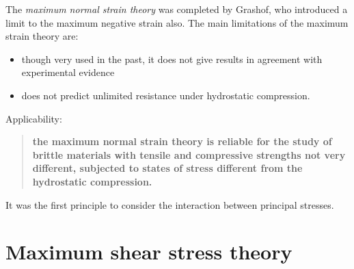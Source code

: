 \documentclass[class=report, crop=false, 12pt,a4paper]{standalone}
\begin{document}
The \textit{maximum normal strain theory} was completed by Grashof, who introduced a limit to the maximum negative strain also. The main limitations of the maximum strain theory are:
\begin{itemize}
  \item though very used in the past, it does not give results in agreement with experimental evidence
  \item does not predict unlimited resistance under hydrostatic compression.
\end{itemize}
Applicability:
\begin{quotation}
  \textbf{the maximum normal strain theory is reliable for the study of brittle materials with tensile and compressive strengths not very different, subjected to states of stress different from the hydrostatic compression.}
\end{quotation}
It was the first principle to consider the interaction between principal stresses.
\section{Maximum shear stress theory}
\end{document}
